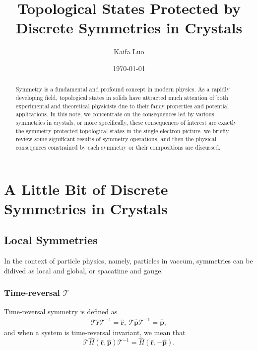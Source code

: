 


\title{Topological States Protected by Discrete Symmetries in Crystals}%

\author{Kaifa Luo}
\date{\today}

\begin{abstract}
Symmetry is a fundamental and profound concept in modern physics. As a rapidly developing field, topological states in solids have attracted much attention of both experimental and theoretical physicists due to their fancy properties and potential applications. In this note, we concentrate on the consequences led by various symmetries in crystals, or more specifically, these consequences of interest are exactly the symmetry protected topological states in the single electron picture. we briefly review some significant results of symmetry operations, and then the physical conseqences constrained by each symmetry or their compositions are discussed.
\end{abstract}

\maketitle

\tableofcontents

\section{A Little Bit of Discrete Symmetries in Crystals}

\subsection{Local Symmetries}
In the context of particle physics, namely, particles in vaccum, symmetries can be didived as local and global, or spacatime and gauge.

\subsubsection{Time-reversal $\mathcal{T}$}
Time-reversal symmetry is defined as
	\begin{equation}\begin{aligned}
	\mathcal{T}\hat{\bm{r}}\mathcal{T}^{-1}=\hat{\bm{r}},~
	\mathcal{T}\hat{\bm{p}}\mathcal{T}^{-1}=\hat{\bm{p}},
	\end{aligned}\end{equation}
and when a system is time-reversal invariant, we mean that
	\begin{equation}
	\mathcal{T}\hat{H}(\hat{\bm{r}},\hat{\bm{p}})\mathcal{T}^{-1}=\hat{H}(\hat{\bm{r}},-\hat{\bm{p}}).
	\end{equation}


